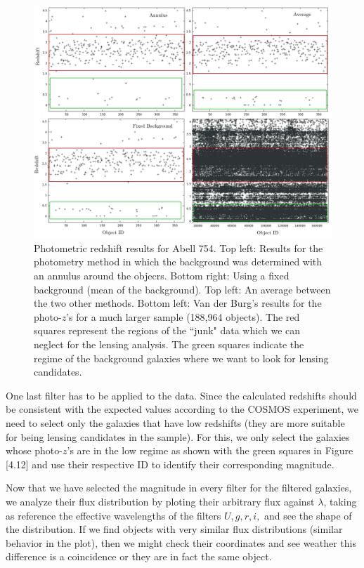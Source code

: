 \begin{figure}[H]
\centering
\includegraphics[width=15cm]{images/photo_z_red_squares.png}
\caption[Photometric redshift results for Abell 754]{Photometric redshift results for Abell 754. Top left: Results for the photometry method in which the background was determined with an annulus around the objecrs. Bottom right: Using a fixed background (mean of the background). Top left: An average between the two other methods. Bottom left: Van der Burg's results for the photo-$z$'s for a much larger sample (188,964 objects). The red squares represent the regions of the ``junk" data which we can neglect for the lensing analysis. The green squares indicate the regime of the background galaxies where we want to look for lensing candidates.}
\end{figure}

One last filter has to be applied to the data. Since the calculated redshifts should be consistent with the expected values according to the COSMOS experiment, we need to select only the galaxies that have low redshifts (they are more suitable for being lensing candidates in the sample). For this, we only select the galaxies whose photo-$z$'s are in the low regime as shown with the green squares in Figure [4.12] and use their respective ID to identify their corresponding magnitude. 

Now that we have selected the magnitude in every filter for the filtered galaxies, we analyze their flux distribution by ploting their arbitrary flux against $\lambda$, taking as reference the effective wavelengths of the filters $U,g,r,i,$ and see the shape of the distribution. If we find objects with very similar flux distributions (similar behavior in the plot), then we might check their coordinates and see weather this difference is a coincidence or they are in fact the same object.

